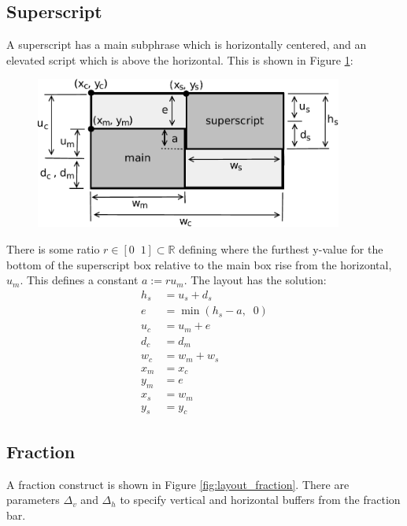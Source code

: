 \documentclass[12pt]{article}
\begin{document}
\subsection{Superscript}

A superscript has a main subphrase which is horizontally centered, and an elevated script which is above the horizontal. This is shown in Figure \ref{fig:layout_superscript}:

\begin{figure}[ht]
	\centering
		\includegraphics[width=0.9\textwidth]{Fig/LayoutSuperscript.pdf}
	\caption{}
	\label{fig:layout_superscript}
\end{figure}

There is some ratio $r \in [0 \;\; 1] \subset \mathbb{R}$ defining where the furthest y-value for the bottom of the superscript box relative to the main box rise from the horizontal, $u_m$. This defines a constant $a := r u_m$. The layout has the solution:
\begin{align*}
h_s &= u_s + d_s \\
e &= \min(h_s-a, \;\; 0) \\
u_c &= u_m + e \\
d_c &= d_m \\
w_c &= w_m + w_s \\
x_m &= x_c \\
y_m &= e \\
x_s &= w_m \\
y_s &= y_c
\end{align*}

\subsection{Fraction}

A fraction construct is shown in Figure \ref{fig:layout_fraction}. There are parameters $\Delta_v$ and $\Delta_h$ to specify vertical and horizontal buffers from the fraction bar.
\end{document}
